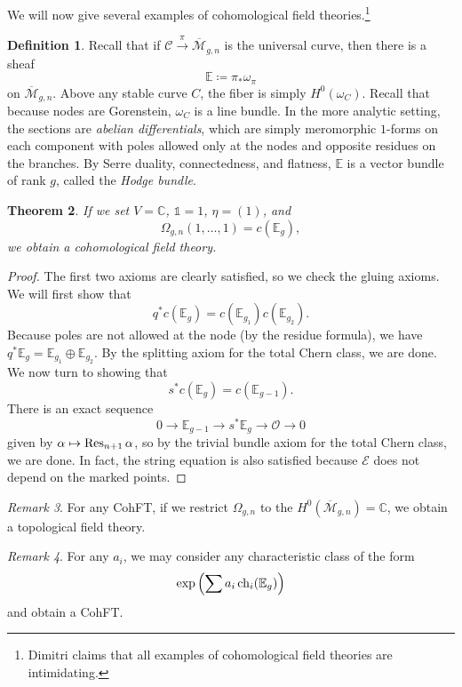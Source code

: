 \documentclass[leqno, openany]{memoir}
\newtheorem{thm}{Theorem}[section]
\theoremstyle{definition}
\newtheorem{defn}[thm]{Definition}
\theoremstyle{remark}
\newtheorem{rmk}[thm]{Remark}
\theoremstyle{plain}
\theoremstyle{definition}
\theoremstyle{remark}
\newcommand{\E}{\mathcal{E}}
\newcommand{\C}{\mathbb{C}}
\newcommand{\mc}[1]{\mathcal{#1}}
\newcommand{\on}[1]{\operatorname{#1}}
\newcommand{\ol}[1]{\overline{#1}}
\begin{document}
We will now give several examples of cohomological field theories.\footnote{Dimitri claims that all examples of cohomological field theories are intimidating.}

\begin{defn}
  Recall that if $\mc{C} \xrightarrow{\pi} \ol{\mc{M}}_{g,n}$ is the universal curve, then there is a sheaf
  \[ \mathbb{E} \coloneqq \pi_* \omega_{\pi} \]
  on $\ol{\mc{M}}_{g,n}$. Above any stable curve $C$, the fiber is simply $H^0(\omega_C)$. Recall that because nodes are Gorenstein, $\omega_C$ is a line bundle. In the more analytic setting, the sections are \textit{abelian differentials}, which are simply meromorphic $1$-forms on each component with poles allowed only at the nodes and opposite residues on the branches. By Serre duality, connectedness, and flatness, $\mathbb{E}$ is a vector bundle of rank $g$, called the \textit{Hodge bundle}.
\end{defn}

\begin{thm}\label{thm:lambdag}
  If we set $V = \C$, $\mathbb{1} = 1$, $\eta = (1)$, and
  \[ \Omega_{g,n}(1, \ldots, 1) = c(\mathbb{E}_g), \]
  we obtain a cohomological field theory.
\end{thm}

\begin{proof}
  The first two axioms are clearly satisfied, so we check the gluing axioms. We will first show that
  \[ q^* c(\mathbb{E}_g) = c(\mathbb{E}_{g_1}) c(\mathbb{E}_{g_2}). \]
  Because poles are not allowed at the node (by the residue formula), we have $q^* \mathbb{E}_g = \mathbb{E}_{g_1} \oplus \mathbb{E}_{g_2}$. By the splitting axiom for the total Chern class, we are done. We now turn to showing that
  \[ s^* c(\mathbb{E}_g) = c(\mathbb{E}_{g-1}). \]
  There is an exact sequence
  \[ 0 \to \mathbb{E}_{g-1} \to s^* \mathbb{E}_g \to \mc{O} \to 0 \]
  given by $\alpha \mapsto \Res_{n+1} \alpha$, so by the trivial bundle axiom for the total Chern class, we are done. In fact, the string equation is also satisfied because $\E$ does not depend on the marked points.
\end{proof}

\begin{rmk}
For any CohFT, if we restrict $\Omega_{g,n}$ to the $H^0(\ol{\mc{M}}_{g,n}) = \C$, we obtain a topological field theory.
\end{rmk}

\begin{rmk}
  For any $a_i$, we may consider any characteristic class of the form
  \[ \exp \qty(\sum a_i \on{ch}_i(\mathbb{E}_g)) \]
  and obtain a CohFT.
\end{rmk}
\end{document}
